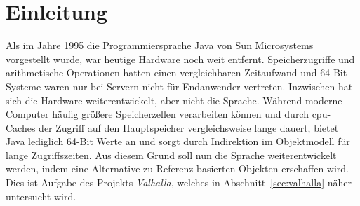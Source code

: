 \section{Einleitung}\label{sec:introduction}

Als im Jahre 1995 die Programmiersprache Java von Sun Microsystems vorgestellt wurde, war heutige Hardware noch weit entfernt.
Speicherzugriffe und arithmetische Operationen hatten einen vergleichbaren Zeitaufwand und 64-Bit Systeme waren nur bei Servern nicht für Endanwender vertreten.
Inzwischen hat sich die Hardware weiterentwickelt, aber nicht die Sprache.
Während moderne Computer häufig größere Speicherzellen verarbeiten können und durch \ac{cpu}-Caches der Zugriff auf den Hauptspeicher vergleichsweise lange dauert, bietet Java lediglich 64-Bit Werte an und sorgt durch Indirektion im Objektmodell für lange Zugriffszeiten.
Aus diesem Grund soll nun die Sprache weiterentwickelt werden, indem eine Alternative zu Referenz-basierten Objekten erschaffen wird.
Dies ist Aufgabe des Projekts \emph{Valhalla}, welches in Abschnitt~\ref{sec:valhalla} näher untersucht wird.
